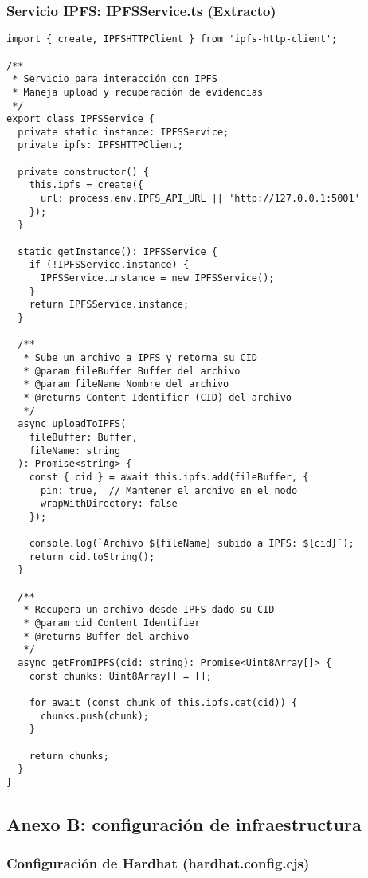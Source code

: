 \subsubsection{Servicio IPFS: IPFSService.ts (Extracto)}

\begin{verbatim}
import { create, IPFSHTTPClient } from 'ipfs-http-client';

/**
 * Servicio para interacción con IPFS
 * Maneja upload y recuperación de evidencias
 */
export class IPFSService {
  private static instance: IPFSService;
  private ipfs: IPFSHTTPClient;

  private constructor() {
    this.ipfs = create({ 
      url: process.env.IPFS_API_URL || 'http://127.0.0.1:5001' 
    });
  }

  static getInstance(): IPFSService {
    if (!IPFSService.instance) {
      IPFSService.instance = new IPFSService();
    }
    return IPFSService.instance;
  }

  /**
   * Sube un archivo a IPFS y retorna su CID
   * @param fileBuffer Buffer del archivo
   * @param fileName Nombre del archivo
   * @returns Content Identifier (CID) del archivo
   */
  async uploadToIPFS(
    fileBuffer: Buffer, 
    fileName: string
  ): Promise<string> {
    const { cid } = await this.ipfs.add(fileBuffer, {
      pin: true,  // Mantener el archivo en el nodo
      wrapWithDirectory: false
    });
    
    console.log(`Archivo ${fileName} subido a IPFS: ${cid}`);
    return cid.toString();
  }

  /**
   * Recupera un archivo desde IPFS dado su CID
   * @param cid Content Identifier
   * @returns Buffer del archivo
   */
  async getFromIPFS(cid: string): Promise<Uint8Array[]> {
    const chunks: Uint8Array[] = [];
    
    for await (const chunk of this.ipfs.cat(cid)) {
      chunks.push(chunk);
    }
    
    return chunks;
  }
}
\end{verbatim}

\subsection{Anexo B: configuración de infraestructura}

\subsubsection{Configuración de Hardhat (hardhat.config.cjs)}

